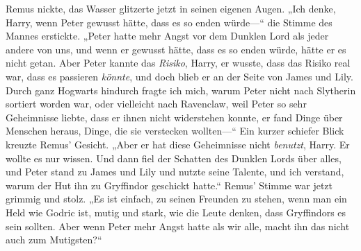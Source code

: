 Remus nickte, das Wasser glitzerte jetzt in seinen eigenen Augen. „Ich denke, Harry, wenn Peter gewusst hätte, dass es so enden würde—“ die Stimme des Mannes erstickte. „Peter hatte mehr Angst vor dem Dunklen Lord als jeder andere von uns, und wenn er gewusst hätte, dass es so enden würde, hätte er es nicht getan. Aber Peter kannte das \emph{Risiko}, Harry, er wusste, dass das Risiko real war, dass es passieren \emph{könnte}, und doch blieb er an der Seite von James und Lily. Durch ganz Hogwarts hindurch fragte ich mich, warum Peter nicht nach Slytherin sortiert worden war, oder vielleicht nach Ravenclaw, weil Peter so sehr Geheimnisse liebte, dass er ihnen nicht widerstehen konnte, er fand Dinge über Menschen heraus, Dinge, die sie verstecken wollten—“ Ein kurzer schiefer Blick kreuzte Remus' Gesicht. „Aber er hat diese Geheimnisse nicht \emph{benutzt}, Harry. Er wollte es nur wissen. Und dann fiel der Schatten des Dunklen Lords über alles, und Peter stand zu James und Lily und nutzte seine Talente, und ich verstand, warum der Hut ihn zu Gryffindor geschickt hatte.“ Remus' Stimme war jetzt grimmig und stolz. „Es ist einfach, zu seinen Freunden zu stehen, wenn man ein Held wie Godric ist, mutig und stark, wie die Leute denken, dass Gryffindors es sein sollten. Aber wenn Peter mehr Angst hatte als wir alle, macht ihn das nicht auch zum Mutigsten?“

